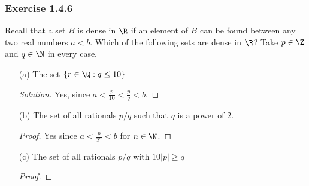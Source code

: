     \subsubsection{Exercise 1.4.6}
    Recall that a set \( B \) is dense in \( \R \) if an element of \( B \) can be found between any two real numbers \( a < b \). Which of the following sets are dense in \( \R \)? Take \( p \in \Z \) and \( q \in \N \) in every case. 
    \begin{enumerate}
        \item[(a)]
        The set \( \{ r \in \Q : q \leq 10  \} \)
        \begin{proof}[Solution]
            Yes, since \( a < \frac{p}{10} < \frac{p}{q} < b \). 
            
        \end{proof}
        
        \item[(b)]
        The set of all rationals \( p/q \) such that \( q \) is a power of 2.
        \begin{proof}
            Yes since \( a < \frac{p}{2^n} < b \) for \( n \in \N \). 
        \end{proof}
        
        \item[(c)] 
        The set of all rationals \( p/q \) with \( 10|p| \geq q \)
            \begin{proof}
                
            \end{proof}
        
    \end{enumerate}







